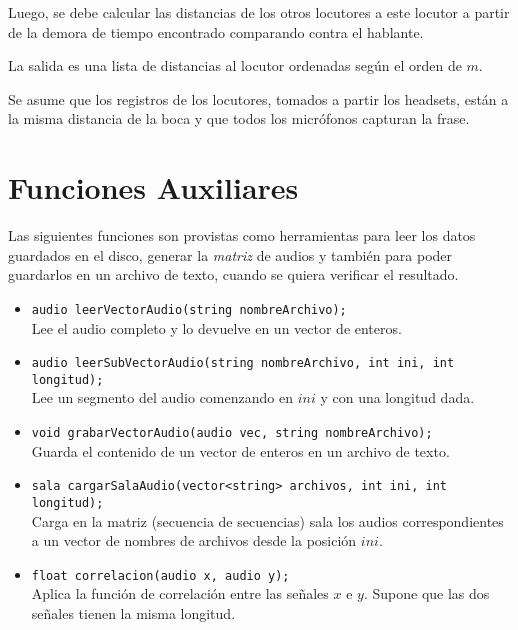 \documentclass[a4paper]{article}
\begin{document}
\begin{enumerate}
Luego, se debe calcular las distancias de los otros locutores a este locutor a partir de la demora de tiempo encontrado comparando contra el hablante.

La salida es una lista de distancias al locutor ordenadas según el orden de $m$.

Se asume que los registros de los locutores, tomados a partir los headsets, están a la misma distancia de la boca y que todos los micrófonos capturan la frase.


\end{enumerate}


\section{Funciones Auxiliares}


Las siguientes funciones son provistas como herramientas para leer los datos guardados en el disco, generar la \textit{matriz} de audios y también para poder guardarlos en un archivo de texto, cuando se quiera verificar el resultado.

\begin{itemize}

\item \lstinline{audio leerVectorAudio(string nombreArchivo); }\\
Lee el audio completo y lo devuelve en un vector de enteros.

\item  \lstinline{audio leerSubVectorAudio(string nombreArchivo, int ini, int longitud);}\\
Lee un segmento del audio comenzando en $ini$ y con una longitud dada.

\item \lstinline{void grabarVectorAudio(audio vec, string nombreArchivo);}\\
Guarda el contenido de un vector de enteros en un archivo de texto.


\item \lstinline{sala cargarSalaAudio(vector<string> archivos, int ini, int longitud);}\\
Carga en la matriz (secuencia de secuencias) sala los audios correspondientes
a un vector de nombres de archivos desde la posición $ini$.

\item \lstinline{float correlacion(audio x, audio y);}\\
Aplica la función de correlación entre las señales $x$ e $y$. Supone que las dos señales tienen la misma longitud.


\end{itemize}
\end{document}
